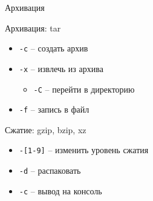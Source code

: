 %
%

\begin{frame}{Архивация}
	\begin{block}{Архивация: tar}
		\begin{itemize}
			\item {\tt -c} -- создать архив
			\item {\tt -x} -- извлечь из архива
				\begin{itemize}
					\item {\tt -C} -- перейти в директорию
				\end{itemize}
			\item {\tt -f} -- запись в файл
		\end{itemize}
	\end{block}

	\begin{block}{Сжатие: gzip, bzip, xz}
		\begin{itemize}
			\item {\tt -[1-9]} -- изменить уровень сжатия
			\item {\tt -d} -- распаковать
			\item {\tt -c} -- вывод на консоль
		\end{itemize}
	\end{block}
\end{frame}

